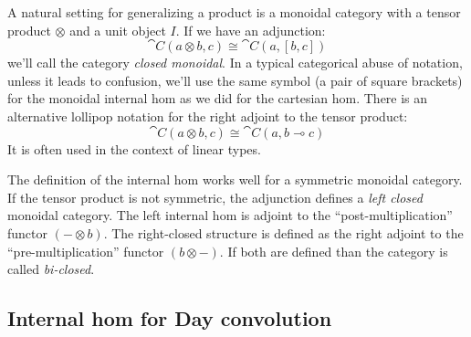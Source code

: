\documentclass[DaoFP]{subfiles}
\begin{document}
A natural setting for generalizing a product is a monoidal category with a tensor product $\otimes$ and a unit object $I$. If we have an adjunction:
\[ \cat C (a \otimes b, c) \cong \cat C (a, [b, c]) \]
we'll call the category \emph{closed monoidal}. In a typical categorical abuse of notation, unless it leads to confusion, we'll use the same symbol (a pair of square brackets)  for the monoidal internal hom as we did for the cartesian hom. There is an alternative lollipop notation for the right adjoint to the tensor product:
\[ \cat C (a \otimes b, c) \cong \cat C (a, b \multimap c) \]
It is often used in the context of linear types.

The definition of the internal hom works well for a symmetric monoidal category. If the tensor product is not symmetric, the adjunction defines a \emph{left closed} monoidal category. The left internal hom is adjoint to the ``post-multiplication'' functor $(- \otimes b)$. The right-closed structure is defined as the right adjoint to the ``pre-multiplication'' functor $(b \otimes -)$. If both are defined than the category is called \emph{bi-closed}.


\subsection{Internal hom for Day convolution}
\end{document}
